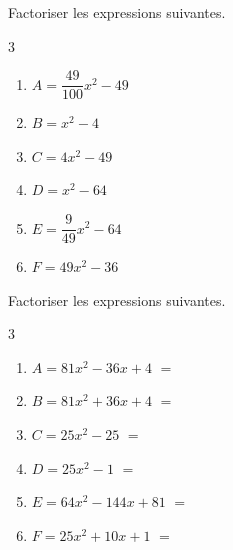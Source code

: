 {%
\begin{Exercice}%
Factoriser les expressions suivantes.
\begin{multicols}{3}
\begin{enumerate}[itemsep=1em,label={}]
	\item \begin{minipage}[t]{\linewidth}$A = \dfrac{49}{100}x^2-49$\end{minipage}
	\item \begin{minipage}[t]{\linewidth}$B = x^2-4$\end{minipage}
	\item \begin{minipage}[t]{\linewidth}$C = 4x^2-49$\end{minipage}
	\item \begin{minipage}[t]{\linewidth}$D = x^2-64$\end{minipage}
	\item \begin{minipage}[t]{\linewidth}$E = \dfrac{9}{49}x^2-64$\end{minipage}
	\item \begin{minipage}[t]{\linewidth}$F = 49x^2-36$\end{minipage}
\end{enumerate}
\end{multicols}
\end{Exercice}

\begin{Exercice}%
Factoriser les expressions suivantes.
\begin{multicols}{3}
\begin{enumerate}[itemsep=1em,label={}]
	\item \begin{minipage}[t]{\linewidth}$A = 81x^2-36x+4$ $=$ \end{minipage}
	\item \begin{minipage}[t]{\linewidth}$B = 81x^2+36x+4$ $=$ \end{minipage}
	\item \begin{minipage}[t]{\linewidth}$C = 25x^2-25$ $=$ \end{minipage}
	\item \begin{minipage}[t]{\linewidth}$D = 25x^2-1$ $=$ \end{minipage}
	\item \begin{minipage}[t]{\linewidth}$E = 64x^2-144x+81$ $=$ \end{minipage}
	\item \begin{minipage}[t]{\linewidth}$F = 25x^2+10x+1$ $=$ \end{minipage}
\end{enumerate}
\end{multicols}
\end{Exercice}

}
